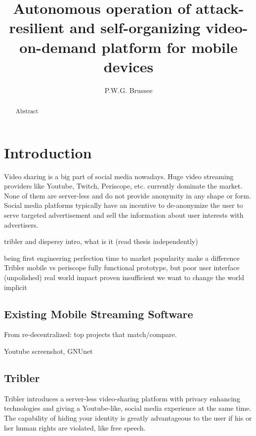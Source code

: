 \documentclass[]{report}
\title{Autonomous operation of attack-resilient and self-organizing video-on-demand  platform for mobile devices}
\author{P.W.G. Brussee}
\begin{document}
\maketitle

\begin{abstract}
	Abstract
\end{abstract}



\chapter{Introduction}

Video sharing is a big part of social media nowadays.
Huge video streaming providers like Youtube, Twitch, Periscope, etc. currently dominate the market.
None of them are server-less and do not  provide anonymity in any shape or form.
Social media platforms typically have an incentive to de-anonymize the user to serve targeted advertisement and sell the information about user interests with advertisers.


tribler and dispersy intro, what is it (read thesis independently)


being first
engineering perfection
time to market
popularity
make a difference
Tribler mobile vs periscope
fully functional prototype, but poor user interface (unpolished)
real world impact proven insufficient
we want to change the world implicit


\section{Existing Mobile Streaming Software}
From re-decentralized: top projects that match/compare.

Youtube screenshot, GNUnet


\section{Tribler}
Tribler introduces a server-less video-sharing platform with privacy enhancing technologies and giving a Youtube-like, social media experience at the same time.
The capability of hiding your identity is greatly advantageous to the user if his or her human rights are violated, like free speech.
\end{document}
